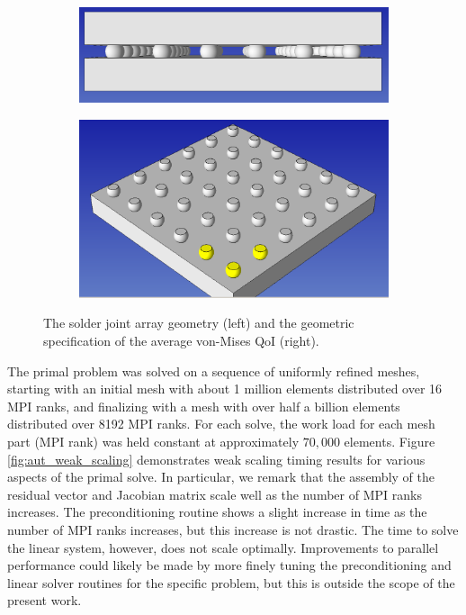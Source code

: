 \begin{figure}[ht!]
\centering
\begin{subfigure}{.5\textwidth}
\centering
\includegraphics[width=.99\linewidth]{img/aut_solder_geom.png}
\end{subfigure}%
\begin{subfigure}{0.5\textwidth}
\centering
\includegraphics[width=.99\linewidth]{img/aut_solder_qoi_geom.png}
\end{subfigure}
\caption{The solder joint array geometry (left) and the
geometric specification of the average von-Mises QoI
(right).}
\label{fig:aut_solder_geom}
\end{figure}

The primal problem was solved on a sequence of uniformly refined
meshes, starting with an initial mesh with about 1 million
elements distributed over 16 MPI ranks, and finalizing with a
mesh with over half a billion elements distributed over
8192 MPI ranks. For each solve, the work load for each mesh
part (MPI rank) was held constant at approximately
$70,000$ elements. Figure \ref{fig:aut_weak_scaling}
demonstrates weak scaling timing results for various aspects
of the primal solve. In particular, we remark that the
assembly of the residual vector and Jacobian matrix scale
well as the number of MPI ranks increases. The preconditioning
routine shows a slight increase in time as the number of
MPI ranks increases, but this increase is not drastic.
The time to solve the linear system, however, does not scale
optimally. Improvements to parallel performance could likely
be made by more finely tuning the preconditioning and linear
solver routines for the specific problem, but this is outside
the scope of the present work.

